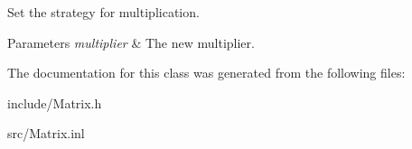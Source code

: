 Set the strategy for multiplication. 


\begin{DoxyParams}{Parameters}
{\em multiplier} & The new multiplier. \\
\hline
\end{DoxyParams}


The documentation for this class was generated from the following files\+:\begin{DoxyCompactItemize}
\item 
include/Matrix.\+h\item 
src/Matrix.\+inl\end{DoxyCompactItemize}
